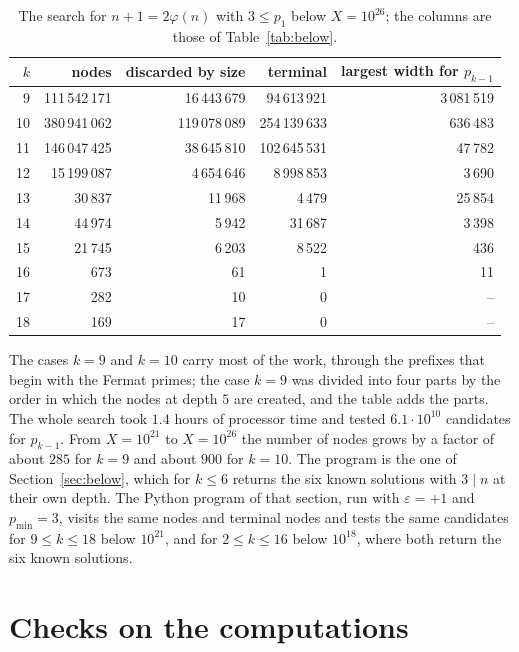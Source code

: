 \documentclass[11pt,reqno]{amsart}
\numberwithin{equation}{section}
\theoremstyle{plain}
\theoremstyle{definition}
\theoremstyle{remark}
\begin{document}
\begin{table}[ht]
\centering
\caption{The search for $n+1=2\varphi(n)$ with $3\le p_1$ below
$X=10^{26}$; the columns are those of Table~\ref{tab:below}.}
\label{tab:secondbelow}
\smallskip
\begin{tabular}{@{}rrrrr@{}}
\toprule
$k$ & nodes & discarded by size & terminal & largest width for $p_{k-1}$ \\
\midrule
9 & 111\,542\,171 & 16\,443\,679 & 94\,613\,921 & 3\,081\,519 \\
10 & 380\,941\,062 & 119\,078\,089 & 254\,139\,633 & 636\,483 \\
11 & 146\,047\,425 & 38\,645\,810 & 102\,645\,531 & 47\,782 \\
12 & 15\,199\,087 & 4\,654\,646 & 8\,998\,853 & 3\,690 \\
13 & 30\,837 & 11\,968 & 4\,479 & 25\,854 \\
14 & 44\,974 & 5\,942 & 31\,687 & 3\,398 \\
15 & 21\,745 & 6\,203 & 8\,522 & 436 \\
16 & 673 & 61 & 1 & 11 \\
17 & 282 & 10 & 0 & -- \\
18 & 169 & 17 & 0 & -- \\
\bottomrule
\end{tabular}
\end{table}

The cases $k=9$ and $k=10$ carry most of the work, through the prefixes
that begin with the Fermat primes; the case $k=9$ was divided into four
parts by the order in which the nodes at depth $5$ are created, and the
table adds the parts. The whole search took $1.4$ hours of processor
time and tested $6.1\cdot10^{10}$ candidates for $p_{k-1}$. From
$X=10^{21}$ to $X=10^{26}$ the number of nodes grows by a factor of
about $285$ for $k=9$ and about $900$ for $k=10$. The
program is the one of Section~\ref{sec:below}, which for $k\le6$
returns the six known solutions with $3\mid n$ at their own depth. The
Python program of that section, run with $\varepsilon=+1$ and
$p_{\min}=3$, visits the same nodes and terminal nodes and tests the
same candidates for $9\le k\le18$ below $10^{21}$, and for $2\le k\le16$
below $10^{18}$, where both return the six known solutions.

\section{Checks on the computations}\label{sec:checks}
\end{document}
